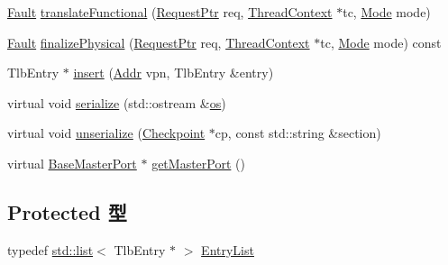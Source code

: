 \begin{DoxyCompactItemize}
\item 
\hyperlink{classRefCountingPtr}{Fault} \hyperlink{classX86ISA_1_1TLB_a26658814c6c9034665aae19cf25545bb}{translateFunctional} (\hyperlink{classRequest}{RequestPtr} req, \hyperlink{classThreadContext}{ThreadContext} $\ast$tc, \hyperlink{classBaseTLB_a46c8a310cf4c094f8c80e1cb8dc1f911}{Mode} mode)
\item 
\hyperlink{classRefCountingPtr}{Fault} \hyperlink{classX86ISA_1_1TLB_ae199d95c42e036851a8a0543c6d6d2e3}{finalizePhysical} (\hyperlink{classRequest}{RequestPtr} req, \hyperlink{classThreadContext}{ThreadContext} $\ast$tc, \hyperlink{classBaseTLB_a46c8a310cf4c094f8c80e1cb8dc1f911}{Mode} mode) const 
\item 
TlbEntry $\ast$ \hyperlink{classX86ISA_1_1TLB_a1b0164809bc96e78b231ff2143eb3cfc}{insert} (\hyperlink{base_2types_8hh_af1bb03d6a4ee096394a6749f0a169232}{Addr} vpn, TlbEntry \&entry)
\item 
virtual void \hyperlink{classX86ISA_1_1TLB_a53e036786d17361be4c7320d39c99b84}{serialize} (std::ostream \&\hyperlink{namespaceX86ISA_a6b6e6ba763e7eaf46ac5b6372ca98d30}{os})
\item 
virtual void \hyperlink{classX86ISA_1_1TLB_af22e5d6d660b97db37003ac61ac4ee49}{unserialize} (\hyperlink{classCheckpoint}{Checkpoint} $\ast$cp, const std::string \&section)
\item 
virtual \hyperlink{classBaseMasterPort}{BaseMasterPort} $\ast$ \hyperlink{classX86ISA_1_1TLB_a2ea87b216b1f58953a679590672be258}{getMasterPort} ()
\end{DoxyCompactItemize}
\subsection*{Protected 型}
\begin{DoxyCompactItemize}
\item 
typedef \hyperlink{classstd_1_1list}{std::list}$<$ TlbEntry $\ast$ $>$ \hyperlink{classX86ISA_1_1TLB_ad1a39a8d54f6e4053979f8c24fe5dcfd}{EntryList}
\end{DoxyCompactItemize}
